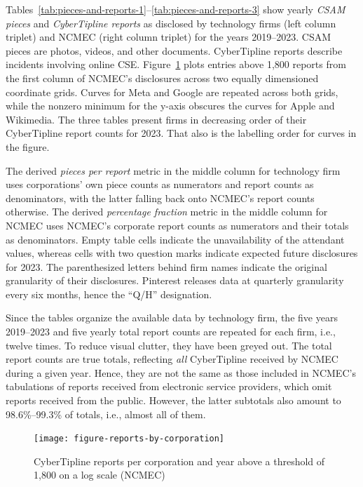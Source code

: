 \documentclass[nonacm,screen]{acmart}
\begin{document}
\begin{itemize}
\begin{table}
\begin{tabular}{r@{\hskip 1.5em}rrr r@{\hskip 1.5em}rrr}
\bottomrule
\end{tabular}
\end{table}

Tables~\ref{tab:pieces-and-reports-1}--\ref{tab:pieces-and-reports-3} show
yearly \emph{CSAM pieces} and \emph{CyberTipline reports} as disclosed by
technology firms (left column triplet) and NCMEC (right column triplet) for the
years 2019--2023. CSAM pieces are photos, videos, and other documents.
CyberTipline reports describe incidents involving online CSE.
Figure~\ref{fig:reports-by-corp} plots entries above 1,800 reports from the
first column of NCMEC's disclosures across two equally dimensioned coordinate
grids. Curves for Meta and Google are repeated across both grids, while the
nonzero minimum for the y-axis obscures the curves for Apple and Wikimedia. The
three tables present firms in decreasing order of their CyberTipline report
counts for 2023. That also is the labelling order for curves in the figure.

The derived \emph{pieces per report} metric in the middle column for technology
firm uses corporations' own piece counts as numerators and report counts as
denominators, with the latter falling back onto NCMEC's report counts otherwise.
The derived \emph{percentage fraction} metric in the middle column for NCMEC
uses NCMEC's corporate report counts as numerators and their totals as
denominators. Empty table cells indicate the unavailability of the attendant
values, whereas cells with two question marks indicate expected future
disclosures for 2023. The parenthesized letters behind firm names indicate the
original granularity of their disclosures. Pinterest releases data at quarterly
granularity every six months, hence the ``Q/H'' designation.

Since the tables organize the available data by technology firm, the five years
2019--2023 and five yearly total report counts are repeated for each firm, i.e.,
twelve times. To reduce visual clutter, they have been greyed out. The total
report counts are true totals, reflecting \emph{all} CyberTipline received by
NCMEC during a given year. Hence, they are not the same as those included in
NCMEC's tabulations of reports received from electronic service providers, which
omit reports received from the public. However, the latter subtotals also amount
to 98.6\%--99.3\% of totals, i.e., almost all of them.

\begin{figure}
\centering\libertineLF
\texttt{[image: figure-reports-by-corporation]}
\caption{CyberTipline reports per corporation and year above a threshold of
 1,800 on a log scale (NCMEC)}
\label{fig:reports-by-corp}
\end{figure}


\end{itemize}
\end{document}
